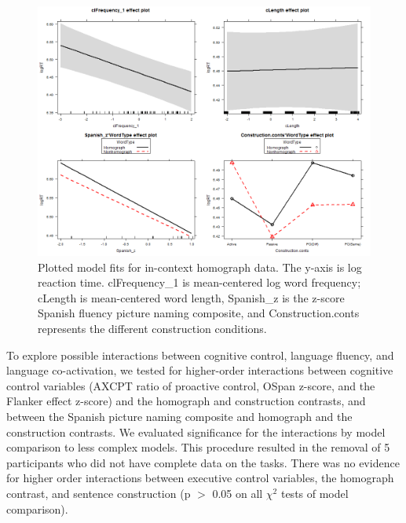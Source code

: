 \begin{figure}[htbp]
\centering
\includegraphics[width=\textwidth,height=\textheight,keepaspectratio]{Rplot35.png}
\caption{Plotted model fits for in-context homograph data. The y-axis is log reaction time. clFrequency\_1 is mean-centered log word frequency; cLength is mean-centered word length, Spanish\_z is the z-score Spanish fluency picture naming composite, and Construction.conts represents the different construction conditions.}
\label{fig:Rplot35}
\end{figure}

To explore possible interactions between cognitive control, language fluency, and language co-activation, we tested for higher-order interactions between cognitive control variables (AXCPT ratio of proactive control, OSpan z-score, and the Flanker effect z-score) and the homograph and construction contrasts, and between the Spanish picture naming composite and homograph and the construction contrasts. We evaluated significance for the interactions by model comparison to less complex models. This procedure resulted in the removal of 5 participants who did not have complete data on the tasks. There was no evidence for higher order interactions between executive control variables, the homograph contrast, and sentence construction (p $>$ 0.05 on all $\chi^2$ tests of model comparison).



